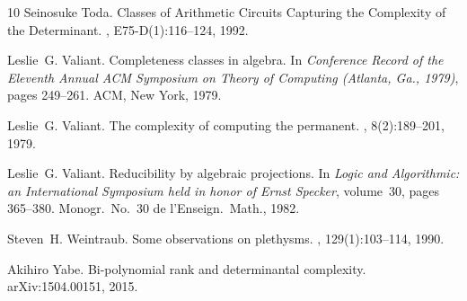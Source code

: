 \documentclass[11pt]{amsart}
\numberwithin{equation}{section}
\begin{document}
\begin{thebibliography}{10}
Seinosuke Toda.
\newblock Classes of {A}rithmetic {C}ircuits {C}apturing the {C}omplexity of
  the {D}eterminant.
, E75-D(1):116--124, 1992.

Leslie~G. Valiant.
\newblock Completeness classes in algebra.
\newblock In {\em Conference {R}ecord of the {E}leventh {A}nnual {ACM}
  {S}ymposium on {T}heory of {C}omputing ({A}tlanta, {G}a., 1979)}, pages
  249--261. ACM, New York, 1979.

Leslie~G. Valiant.
\newblock The complexity of computing the permanent.
, 8(2):189--201, 1979.

Leslie~G. Valiant.
\newblock Reducibility by algebraic projections.
\newblock In {\em Logic and Algorithmic: an International Symposium held in
  honor of Ernst Speck\-er}, volume~30, pages 365--380. Monogr.\ {N}o.~30 de
  l'{E}nseign.\ Math., 1982.

Steven~H. Weintraub.
\newblock Some observations on plethysms.
, 129(1):103--114, 1990.

Akihiro Yabe.
\newblock Bi-polynomial rank and determinantal complexity.
\newblock arXiv:1504.00151, 2015.

\end{thebibliography}
\end{document}
